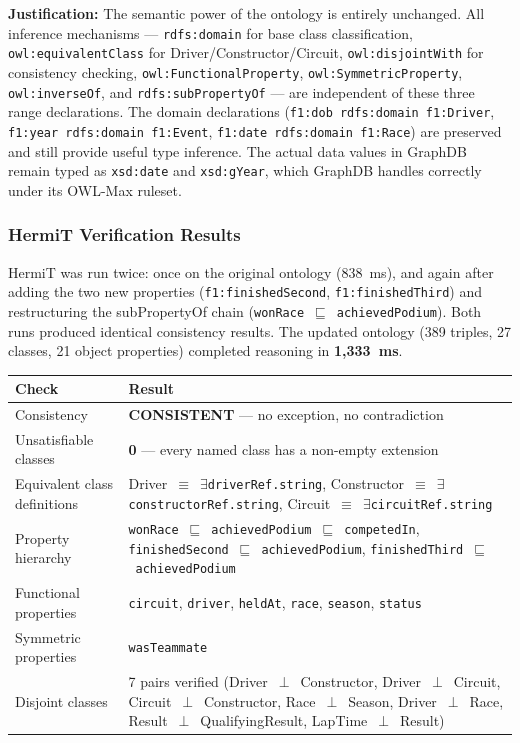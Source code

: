 \documentclass[12pt,a4paper]{article}
\begin{document}
\textbf{Justification:} The semantic power of the ontology is entirely unchanged.
All inference mechanisms --- \texttt{rdfs:domain} for base class classification,
\texttt{owl:equivalentClass} for Driver/Constructor/Circuit,
\texttt{owl:disjointWith} for consistency checking,
\texttt{owl:FunctionalProperty}, \texttt{owl:SymmetricProperty},
\texttt{owl:inverseOf}, and \texttt{rdfs:subPropertyOf} --- are independent of
these three range declarations. The domain declarations
(\texttt{f1:dob rdfs:domain f1:Driver}, \texttt{f1:year rdfs:domain f1:Event},
\texttt{f1:date rdfs:domain f1:Race}) are preserved and still provide useful
type inference. The actual data values in GraphDB remain typed as
\texttt{xsd:date} and \texttt{xsd:gYear}, which GraphDB handles correctly
under its OWL-Max ruleset.

\subsubsection{HermiT Verification Results}

HermiT was run twice: once on the original ontology (838~ms), and again after
adding the two new properties (\texttt{f1:finishedSecond}, \texttt{f1:finishedThird})
and restructuring the subPropertyOf chain (\texttt{wonRace}~$\sqsubseteq$~\texttt{achievedPodium}).
Both runs produced identical consistency results. The updated ontology (389 triples,
27 classes, 21 object properties) completed reasoning in \textbf{1{,}333~ms}.

\begin{center}
\begin{tabular}{@{}lp{10cm}@{}}
\toprule
\textbf{Check} & \textbf{Result} \\
\midrule
Consistency & \textbf{CONSISTENT} --- no exception, no contradiction \\
Unsatisfiable classes & \textbf{0} --- every named class has a non-empty extension \\
Equivalent class definitions & Driver~$\equiv$~$\exists$\texttt{driverRef.string},
  Constructor~$\equiv$~$\exists$\texttt{constructorRef.string},
  Circuit~$\equiv$~$\exists$\texttt{circuitRef.string} \\
Property hierarchy & \texttt{wonRace}~$\sqsubseteq$~\texttt{achievedPodium}~$\sqsubseteq$~\texttt{competedIn},
  \texttt{finishedSecond}~$\sqsubseteq$~\texttt{achievedPodium},
  \texttt{finishedThird}~$\sqsubseteq$~\texttt{achievedPodium} \\
Functional properties & \texttt{circuit}, \texttt{driver}, \texttt{heldAt},
  \texttt{race}, \texttt{season}, \texttt{status} \\
Symmetric properties & \texttt{wasTeammate} \\
Disjoint classes & 7 pairs verified (Driver~$\perp$~Constructor, Driver~$\perp$~Circuit,
  Circuit~$\perp$~Constructor, Race~$\perp$~Season, Driver~$\perp$~Race,
  Result~$\perp$~QualifyingResult, LapTime~$\perp$~Result) \\
\bottomrule
\end{tabular}
\end{center}
\end{document}
